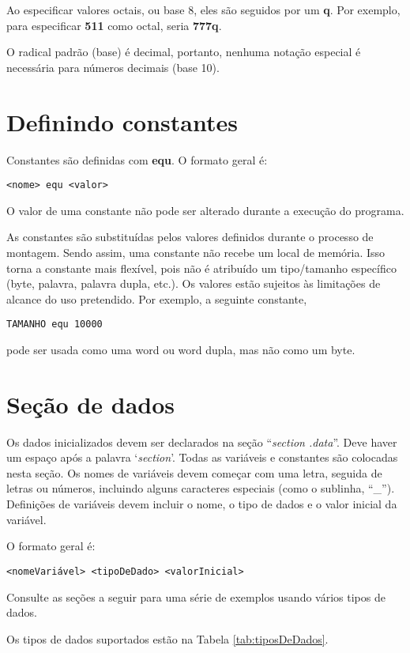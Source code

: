 Ao especificar valores octais, ou base 8, eles são seguidos por um \textbf{q}. Por exemplo, para especificar \textbf{511} como octal, seria \textbf{777q}.

O radical padrão (base) é decimal, portanto, nenhuma notação especial é necessária para números decimais (base 10).

\section{Definindo constantes}
Constantes são definidas com \textbf{equ}. O formato geral é:

\begin{verbatim}
<nome> equ <valor>
\end{verbatim}

O valor de uma constante não pode ser alterado durante a execução do programa.

As constantes são substituídas pelos valores definidos durante o processo de montagem. Sendo assim, uma constante não recebe um local de memória. Isso torna a constante mais flexível, pois não é atribuído um tipo/tamanho específico (byte, palavra, palavra dupla, etc.). Os valores estão sujeitos às limitações de alcance do uso pretendido. Por exemplo, a seguinte constante,
\begin{verbatim}
TAMANHO equ 10000
\end{verbatim}
pode ser usada como uma word ou word dupla, mas não como um byte.

\section{Seção de dados}
Os dados inicializados devem ser declarados na seção ``\textit{section .data}''. Deve haver um espaço após a palavra `\textit{section}'. Todas as variáveis e constantes são colocadas nesta seção. Os nomes de variáveis devem começar com uma letra, seguida de letras ou números, incluindo alguns caracteres especiais (como o sublinha, ``\_''). Definições de variáveis devem incluir o nome, o tipo de dados e o valor inicial da variável.

O formato geral é:
\begin{verbatim}
<nomeVariável> <tipoDeDado> <valorInicial>
\end{verbatim}

Consulte as seções a seguir para uma série de exemplos usando vários tipos de dados.

Os tipos de dados suportados estão na Tabela \ref{tab:tiposDeDados}.

